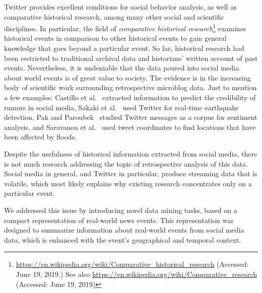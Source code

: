 %
Twitter provides excellent conditions for social behavior analysis, as well as
comparative historical research, among many other social and scientific
disciplines.  
%
In particular, the field of {\em comparative historical
research}\footnote{\url{https://en.wikipedia.org/wiki/Comparative_historical_research}
(Accessed: June 19, 2019.) See also
\url{https://en.wikipedia.org/wiki/Comparative_research} (Accessed: June 19,
2019)} examines historical events in comparison to other historical events to
gain general knowledge that goes beyond a particular event. 
%
So far, historical research had been restricted to traditional archival data and
historians' written account of past events. 
%
Nevertheless, it is undeniable that the data poured into social media about
world events is of great value to society. 
%
The evidence is in the increasing body of scientific work surrounding retrospective
microblog data.  
%
Just to mention a few examples: Castillo et al.~\cite{castillo2011information}
extracted information to predict the credibility of rumors in social media,
Sakaki et al.~\cite{Sakaki2010} used Twitter for real-time earthquake detection,
Pak and Paroubek~\cite{Pak:Twitter:2010} studied Twitter messages as a corpus
for sentiment analysis, and Saravanou et al.~\cite{Saravanou:Twitter:2015} used
tweet coordinates to find locations that have been affected by floods.


Despite the usefulness of historical information extracted from social media,
there is not much research addressing the topic of retrospective analysis of
this data.
%
Social media in general, and Twitter in particular, produce streaming data that
is volatile, which most likely explains why existing research concentrates only
on a particular event.

We addressed this issue by introducing novel data mining tasks, based on a
compact representation of real-world news events. 
%
This representation was designed to summarize information about real-world
events from social media data, which is enhanced with the event's geographical
and temporal context.


